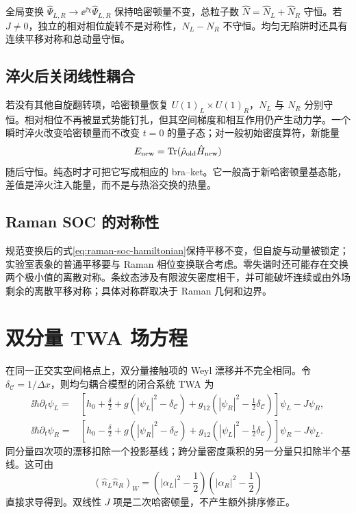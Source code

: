 全局变换 $\hat\Psi_{L,R}\to\ee^{\ii\chi}\hat\Psi_{L,R}$ 保持哈密顿量不变，总粒子数
$\hat N=\hat N_L+\hat N_R$ 守恒。若 $J\neq0$，独立的相对相位旋转不是对称性，$N_L-N_R$ 不守恒。均匀无陷阱时还具有连续平移对称和总动量守恒。

\subsection{淬火后关闭线性耦合}

若没有其他自旋翻转项，哈密顿量恢复
$U(1)_L\times U(1)_R$，$N_L$ 与 $N_R$ 分别守恒。相对相位不再被显式势能钉扎，但其空间梯度和相互作用仍产生动力学。一个瞬时淬火改变哈密顿量而不改变 $t=0$ 的量子态；对一般初始密度算符，新能量
\begin{equation}
  E_{\rm new}=\operatorname{Tr}(\hat\rho_{\rm old}\hat H_{\rm new})
  \label{eq:postquench-energy}
\end{equation}
随后守恒。纯态时才可把它写成相应的 bra--ket。它一般高于新哈密顿量基态能，差值是淬火注入能量，而不是与热浴交换的热量。

\subsection{Raman SOC 的对称性}

规范变换后的式\eqref{eq:raman-soc-hamiltonian}保持平移不变，但自旋与动量被锁定；实验室表象的普通平移要与 Raman 相位变换联合考虑。零失谐时还可能存在交换两个极小值的离散对称。条纹态涉及有限波矢密度相干，并可能破坏连续或由外场剩余的离散平移对称；具体对称群取决于 Raman 几何和边界。

\section{双分量 TWA 场方程}

在同一正交实空间格点上，双分量接触项的 Weyl 漂移并不完全相同。令
$\delta_{\mathcal C}=1/\Delta x$，则均匀耦合模型的闭合系统 TWA 为
\begin{align}
  \ii\hbar\partial_t\psi_L={}&\left[
  h_0+\frac{\delta}{2}
  +g(|\psi_L|^2-\delta_{\mathcal C})
  +g_{12}\left(|\psi_R|^2-\frac12\delta_{\mathcal C}\right)
  \right]\psi_L-J\psi_R,
  \label{eq:two-component-twa-l}\\
  \ii\hbar\partial_t\psi_R={}&\left[
  h_0-\frac{\delta}{2}
  +g(|\psi_R|^2-\delta_{\mathcal C})
  +g_{12}\left(|\psi_L|^2-\frac12\delta_{\mathcal C}\right)
  \right]\psi_R-J\psi_L.
  \label{eq:two-component-twa-r}
\end{align}
同分量四次项的漂移扣除一个投影基线；跨分量密度乘积的另一分量只扣除半个基线。这可由
\begin{equation}
  (\hat n_L\hat n_R)_W
  =\left(|\alpha_L|^2-\frac12\right)
   \left(|\alpha_R|^2-\frac12\right)
  \label{eq:cross-interaction-weyl}
\end{equation}
直接求导得到。双线性 $J$ 项是二次哈密顿量，不产生额外排序修正。

